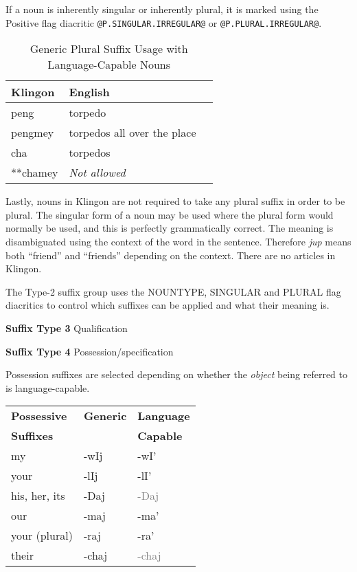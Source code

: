 \documentclass[11pt]{article}
\begin{document}
If a noun is inherently singular or inherently plural, it is marked using the Positive flag diacritic \texttt{@P.SINGULAR.IRREGULAR@} or \texttt{@P.PLURAL.IRREGULAR@}.
	
	\begin{table}[h]
	\begin{center}
	\begin{tabular}{lll}
	\toprule
	\bf Klingon & \bf English \\
	\midrule
	peng & torpedo \\
	pengmey & torpedos all over the place \\
	cha & torpedos \\
	**chamey & \it Not allowed \\
	\bottomrule
	\end{tabular}
	\end{center}
	\caption{Generic Plural Suffix Usage with Language-Capable Nouns}
	\end{table}

Lastly, nouns in Klingon are not required to take any plural suffix in order to be plural. The singular form of a noun may be used where the plural form would normally be used, and this is perfectly grammatically correct. The meaning is disambiguated using the context of the word in the sentence. Therefore \textit{jup} means both ``friend'' and ``friends'' depending on the context. There are no articles in Klingon.
	
The Type-2 suffix group uses the NOUNTYPE, SINGULAR and PLURAL flag diacritics to control which suffixes can be applied and what their meaning is.

\textbf{Suffix Type 3} Qualification
	
\textbf{Suffix Type 4} Possession/specification
	
Possession suffixes are selected depending on whether the \textit{object} being referred to is language-capable.

	\begin{center}
	\begin{tabular}{lll}
	\toprule
	\bf{Possessive} & \bf{Generic} & \bf{Language} \\
	\bf{Suffixes} & & \bf{Capable} \\
	\midrule
	my & -wIj & -wI' \\ \hline
	your & -lIj & -lI' \\ \hline
	his, her, its & -Daj & \textcolor{gray}{-Daj} \\ \hline
	our & -maj & -ma' \\ \hline
	your (plural) & -raj & -ra' \\ \hline
	their & -chaj & \textcolor{gray}{-chaj} \\
	\bottomrule
	\end{tabular}
	\end{center}
	
\end{document}
